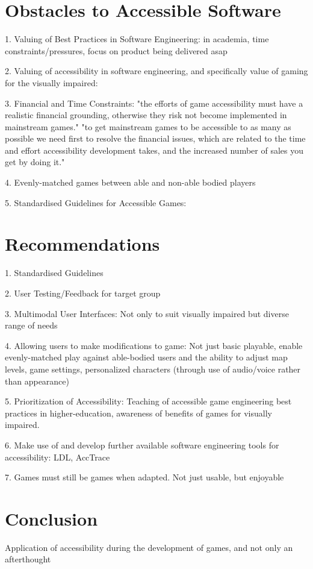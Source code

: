 \documentclass{scrartcl}
\begin{document}
\section{Obstacles to Accessible Software}

1.	Valuing of Best Practices in Software Engineering: in academia, time constraints/pressures, focus on product being delivered asap

2.	Valuing of accessibility in software engineering, and specifically value of gaming for the visually impaired:

3.	Financial and Time Constraints: "the efforts of game accessibility must have a realistic financial grounding, otherwise they risk not become implemented in mainstream games." "to get mainstream games to be accessible to as many as possible we need first to resolve the financial issues, which are related to the time and effort accessibility development takes, and the increased number of sales you get by doing it." \cite{14}

4.	Evenly-matched games between able and non-able bodied players

5.	Standardised Guidelines for Accessible Games:

\section{Recommendations}

1.	Standardised Guidelines

2.	User Testing/Feedback for target group

3.	Multimodal User Interfaces: Not only to suit visually impaired but diverse range of needs

4.	Allowing users to make modifications to game: Not just basic playable, enable evenly-matched play against able-bodied users and the ability to adjust map levels, game settings, personalized characters (through use of audio/voice rather than appearance)

5.	Prioritization of Accessibility: Teaching of accessible game engineering best practices in higher-education, awareness of benefits of games for visually impaired.

6.	Make use of and develop further available software engineering tools for accessibility: LDL, AccTrace

7.	Games must still be games when adapted. Not just usable, but enjoyable

\section{Conclusion}

Application of accessibility during the development of games, and not only an afterthought




\end{document}
